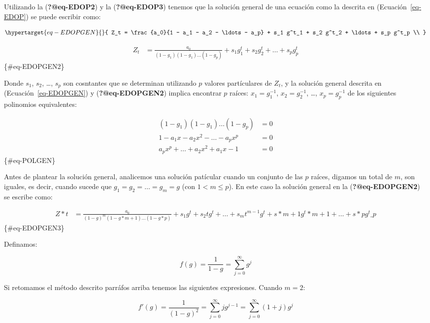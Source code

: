 \documentclass[
  a4paper,
]{article}
\begin{document}
Utilizando la (\textbf{?@eq-EDOP2}) y la (\textbf{?@eq-EDOP3}) tenemos
que la solución general de una ecuación como la descrita en
(Ecuación~\ref{eq-EDOP}) se puede escribir como:

\begin{equation}\protect\hypertarget{eq-EDOPGEN}{}{
Z_t  =  \frac{a_0}{1 - a_1 - a_2 - \ldots - a_p} + s_1 g^t_1 + s_2 g^t_2 + \ldots + s_p g^t_p \\
}\label{eq-EDOPGEN}\end{equation}

\begin{align}
Z_t & = \frac{a_0}{(1 - g_1)(1 - g_1) \ldots (1 - g_p)} + s_1 g^t_1 + s_2 g^t_2 + \ldots + s_p g^t_p
\end{align} \{\#eq-EDOPGEN2\}

Donde \(s_1\), \(s_2\), \ldots, \(s_p\) son cosntantes que se determinan
utilizando \(p\) valores partículares de \(Z_t\), y la solución general
descrita en (Ecuación~\ref{eq-EDOPGEN}) y (\textbf{?@eq-EDOPGEN2})
implica encontrar \(p\) raíces: \(x_1 = g^{-1}_1\), \(x_2 = g^{-1}_2\),
\ldots, \(x_p = g^{-1}_p\) de los siguientes polinomios equivalentes:

\begin{align}
(1 - g_1)(1 - g_1) \ldots (1 - g_p) & = 0 \\
1 - a_1 x - a_2 x^2 - \ldots - a_p x^p & = 0 \\
a_p x^p + \ldots + a_2 x^2 + a_1 x - 1 & = 0
\end{align} \{\#eq-POLGEN\}

Antes de plantear la solución general, analicemos una solución patícular
cuando un conjunto de las \(p\) raíces, digamos un total de \(m\), son
iguales, es decir, cuando sucede que \(g_1 = g_2 = \ldots = g_m = g\)
(con \(1 < m \leq p\)). En este caso la solución general en la
(\textbf{?@eq-EDOPGEN2}) se escribe como:

\begin{align}
Z*t & = \frac{a_0}{(1 - g)^m(1 - g*{m+1}) \ldots (1 - g*p)} + s_1 g^t + s_2 t g^t + \ldots + s_m t^{m-1} g^t + s*{m+1} g^t*{m+1} + \ldots + s*{p} g^t\_{p}
\end{align} \{\#eq-EDOPGEN3\}

Definamos:

\[
f(g) = \frac{1}{1 - g} = \sum_{j = 0}^{\infty} g^j
\]

Si retomamos el método descrito parráfos arriba tenemos las siguientes
expresiones. Cuando \(m = 2\):

\[
f'(g) = \frac{1}{(1 - g)^2} = \sum_{j = 0}^{\infty} j g^{j-1} = \sum_{j = 0}^{\infty} (1 + j) g^j \nonumber
\]
\end{document}
